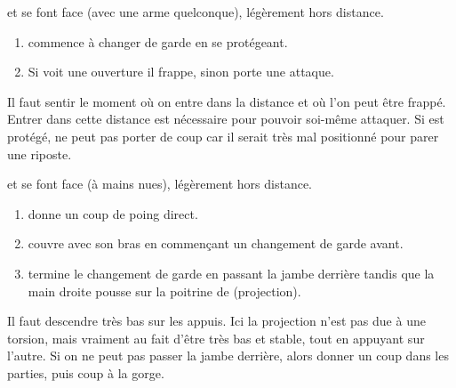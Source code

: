 \begin{exercice}
\label{att:ex:changement-garde-2-temps-test}

\A et \D se font face (avec une arme quelconque), légèrement hors distance.

\begin{enumerate}
	\item \A commence à changer de garde en se protégeant.
	
	\item Si \D voit une ouverture il frappe, sinon \A porte une attaque.
\end{enumerate}

Il faut sentir le moment où on entre dans la distance et où l'on peut être frappé.
Entrer dans cette distance est nécessaire pour pouvoir soi-même attaquer.
Si \A est protégé, \D ne peut pas porter de coup car il serait très mal positionné pour parer une riposte.
\end{exercice}


\begin{exercice}
\label{att:ex:changement-garde-2-temps-projection}

\A et \D se font face (à mains nues), légèrement hors distance.

\begin{enumerate}
	\item \A donne un coup de poing direct.
	
	\item \D couvre avec son bras en commençant un changement de garde avant.
	
	\item \D termine le changement de garde en passant la jambe derrière \D tandis que la main droite pousse sur la poitrine de \A (projection).
\end{enumerate}

Il faut descendre très bas sur les appuis.
Ici la projection n'est pas due à une torsion, mais vraiment au fait d'être très bas et stable, tout en appuyant sur l'autre.
Si on ne peut pas passer la jambe derrière, alors donner un coup dans les parties, puis coup à la gorge.
\end{exercice}


